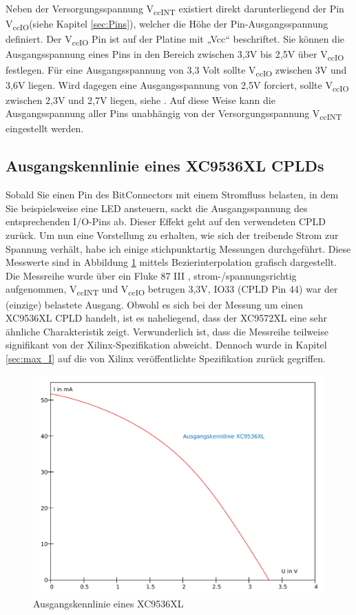 \documentclass{article}
\begin{document}
{Neben der Versorgungsspannung V\textsubscript{ccINT} existiert direkt darunterliegend der Pin V\textsubscript{ccIO}(siehe Kapitel \ref{sec:Pins}), welcher die Höhe der Pin-Ausgangsspannung definiert. Der V\textsubscript{ccIO} Pin ist auf der Platine mit „Vcc“ beschriftet. Sie können die Ausgangsspannung eines Pins in den Bereich zwischen 3,3V bis 2,5V über  V\textsubscript{ccIO} festlegen. Für eine Ausgangsspannung von 3,3 Volt sollte V\textsubscript{ccIO} zwischen 3V und 3,6V liegen. Wird dagegen eine Ausgangsspannung von 2,5V forciert, sollte V\textsubscript{ccIO} zwischen 2,3V und 2,7V liegen, siehe \autocite[3]{XC95_Spec}. Auf diese Weise kann die Ausgangsspannung aller Pins unabhängig von der Versorgungsspannung V\textsubscript{ccINT} eingestellt werden.

\subsection{Ausgangskennlinie eines XC9536XL CPLDs}
Sobald Sie einen Pin des BitConnectors mit einem Stromfluss belasten, in dem Sie beispielsweise eine LED ansteuern, sackt die Ausgangsspannung des entsprechenden I/O-Pins ab. Dieser Effekt geht auf den verwendeten CPLD zurück. Um nun eine Vorstellung zu erhalten, wie sich der treibende Strom zur Spannung verhält, habe ich einige stichpunktartig Messungen durchgeführt. Diese Messwerte sind in Abbildung \ref{fig:out_characteristics} mittels Bezierinterpolation grafisch dargestellt.
Die Messreihe wurde über ein Fluke 87 III , strom-/spannungsrichtig aufgenommen, V\textsubscript{ccINT} und V\textsubscript{ccIO} betrugen 3,3V, IO33 (CPLD Pin 44) war der (einzige) belastete Ausgang. Obwohl es sich bei der Messung um einen XC9536XL CPLD handelt, ist es naheliegend, dass der XC9572XL eine sehr ähnliche Charakteristik zeigt. Verwunderlich ist, dass die Messreihe teilweise signifikant von der Xilinx-Spezifikation \autocite[6]{XC_Curves} abweicht.  Dennoch wurde in Kapitel \ref{sec:max_I} auf die von Xilinx veröffentlichte Spezifikation zurück gegriffen.

\begin{figure}[!h]
	\centering
	\includegraphics[width=0.7\linewidth]{Figures/XC9536_output_characteristics}
	\caption{Ausgangskennlinie eines XC9536XL}
	\label{fig:out_characteristics}
\end{figure}

}
\end{document}
